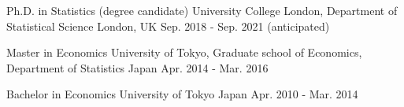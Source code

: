 
\begin{cventries}

  \cventry
    {Ph.D. in Statistics (degree candidate)} %
    {University College London, Department of Statistical Science} %
    {London, UK} %
    {Sep. 2018 - Sep. 2021 (anticipated)} %
    {
    }

\end{cventries}

\begin{cventries}

  \cventry
    {Master in Economics} %
    {University of Tokyo, Graduate school of Economics, Department of Statistics} %
    {Japan} %
    {Apr. 2014 - Mar. 2016} %
    {
    }

\end{cventries}

\begin{cventries}

  \cventry
    {Bachelor in Economics} %
    {University of Tokyo} %
    {Japan} %
    {Apr. 2010 - Mar. 2014} %
    {
    }

\end{cventries}
